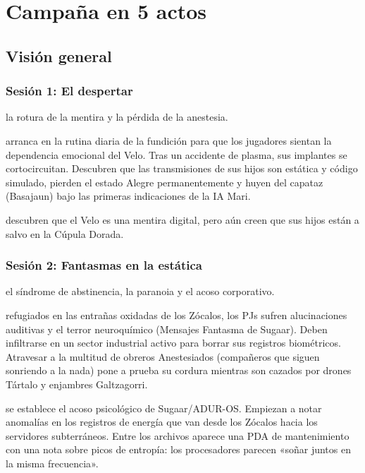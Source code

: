 \chapter{Campaña en 5 actos}
\label{cap:campana}

\section{Visión general}

\subsection{Sesión 1: El despertar}
 la rotura de la mentira y la pérdida de la anestesia.\par
{} arranca en la rutina diaria de la fundición para que los jugadores sientan la dependencia emocional del Velo. Tras un accidente de plasma, sus implantes se cortocircuitan. Descubren que las transmisiones de sus hijos son estática y código simulado, pierden el estado Alegre permanentemente y huyen del capataz (Basajaun) bajo las primeras indicaciones de la IA Mari.\par
{} descubren que el Velo es una mentira digital, pero aún creen que sus hijos están a salvo en la Cúpula Dorada.

\subsection{Sesión 2: Fantasmas en la estática}
 el síndrome de abstinencia, la paranoia y el acoso corporativo.\par
{} refugiados en las entrañas oxidadas de los Zócalos, los PJs sufren alucinaciones auditivas y el terror neuroquímico (Mensajes Fantasma de Sugaar). Deben infiltrarse en un sector industrial activo para borrar sus registros biométricos. Atravesar a la multitud de obreros Anestesiados (compañeros que siguen sonriendo a la nada) pone a prueba su cordura mientras son cazados por drones Tártalo y enjambres Galtzagorri.\par
{} se establece el acoso psicológico de Sugaar/ADUR-OS. Empiezan a notar anomalías en los registros de energía que van desde los Zócalos hacia los servidores subterráneos. Entre los archivos aparece una PDA de mantenimiento con una nota sobre picos de entropía: los procesadores parecen «soñar juntos en la misma frecuencia».

